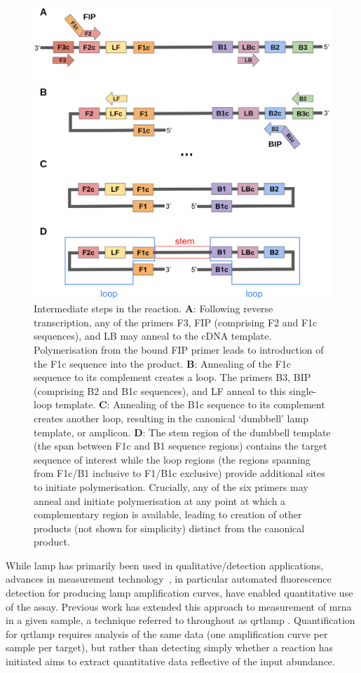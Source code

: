 \documentclass[../thesis.tex]{subfiles}
\begin{document}
\begin{figure}[!tpb] 
\centering
\includegraphics[width=5in]{../figures/chapter2/paper_lamp_fig.png}
\caption{Intermediate steps in the  reaction. \textbf{A}: Following reverse transcription, any of the primers F3, FIP (comprising F2 and F1c sequences), and LB may anneal to the cDNA template. Polymerisation from the bound FIP primer leads to introduction of the F1c sequence into the product. \textbf{B}: Annealing of the F1c sequence to its complement creates a loop. The primers B3, BIP (comprising B2 and B1c sequences), and LF anneal to this single-loop template. \textbf{C}: Annealing of the B1c sequence to its complement creates another loop, resulting in the canonical `dumbbell' \gls{lamp} template, or amplicon. \textbf{D}: The stem region of the dumbbell template (the span between F1c and B1 sequence regions) contains the target sequence of interest while the loop regions (the regions spanning from F1c/B1 inclusive to F1/B1c exclusive) provide additional sites to initiate polymerisation. Crucially, any of the six primers may anneal and initiate polymerisation at any point at which a complementary region is available, leading to creation of other products (not shown for simplicity) distinct from the canonical product.\label{fig:lampoverview}}
\end{figure}
While \gls{lamp} has primarily been used in qualitative/detection applications, advances in measurement technology~\citep{zhang_brief_2014, becherer_loop-mediated_2020}, in particular automated fluorescence detection for producing \gls{lamp} amplification curves, have enabled quantitative use of the assay. Previous work has extended this approach to measurement of \gls{mrna} in a given sample, a technique referred to throughout as \gls{qrtlamp} \citep{remmel_diagnostic_2022}. Quantification for \gls{qrtlamp} requires analysis of the same data (one amplification curve per sample per target), but rather than detecting simply whether a reaction has initiated aims to extract quantitative data reflective of the input  abundance.
\end{document}
